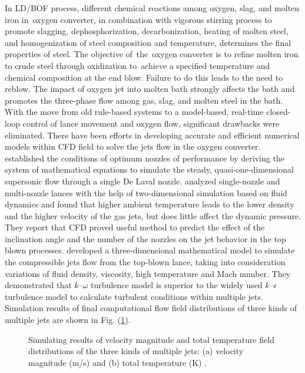 In LD/BOF process, different chemical reactions among oxygen, slag, and molten iron in~oxygen converter, in combination with vigorous stirring process to promote slagging, dephosphorization, decarbonization, heating of molten steel, and homogenization of steel composition and temperature, determines the final properties of steel. The objective of~the~oxygen converter is to refine molten iron to crude steel through oxidization to~achieve a specified temperature and chemical composition at the end blow. Failure to do this leads to the need to reblow. The impact of oxygen jet into molten bath strongly affects the bath and promotes the three-phase flow among gas, slag, and molten steel in the bath. With the move from old rule-based systems to a model-based, real-time closed-loop control of lance movement and oxygen flow, significant drawbacks were eliminated. There have been efforts in developing accurate and efficient numerical models within CFD field to solve the jets flow in the oxygen converter. \citet{Peng1996} established the conditions of optimum nozzles of performance by deriving the system of mathematical equations to simulate the steady, quasi-one-dimensional supersonic flow through a single De Laval nozzle. \citet{Tago2003} analyzed single-nozzle and multi-nozzle lances with the help of two-dimensional simulation based on fluid dynamics and found that higher ambient temperature leads to the lower density and the higher velocity of the gas jets, but does little affect the dynamic pressure. They report that CFD proved useful method to predict the effect of the inclination angle and the number of the nozzles on the jet behavior in the top blown processes. \citet{WangW2010} developed a three-dimensional mathematical model to simulate the compressible jets flow from the top-blown lance, taking into consideration variations of fluid density, viscosity, high temperature and Mach number. They demonstrated that $k–\omega$ turbulence model is superior to the widely used $k–\epsilon$ turbulence model to calculate turbulent conditions within multiple jets. Simulation results of final computational flow field distributions of three kinds of multiple jets are shown in Fig. (\ref{o:m1}).

\begin{figure}[h!tbp]
	\centering
	\hfill
	\caption{Simulating results of velocity magnitude and total temperature field distributions of the three kinds of multiple jets: (a) velocity magnitude (m/s) and (b) total temperature (K) \citep{WangW2010}.}
	\label{o:m1}
\end{figure}

